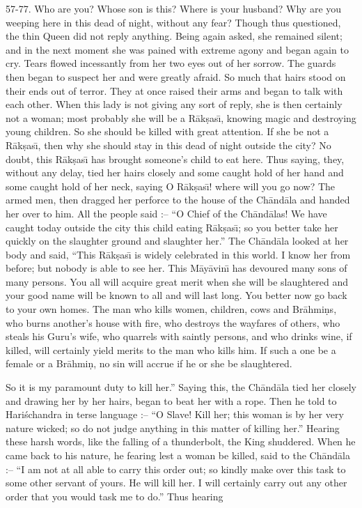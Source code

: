 57-77. Who are you? Whose son is this? Where is your husband? Why are you weeping here in this dead of night, without any fear? Though thus questioned, the thin Queen did not reply anything. Being again asked, she remained silent; and in the next moment she was pained with extreme agony and began again to cry. Tears flowed incessantly from her two eyes out of her sorrow. The guards then began to suspect her and were greatly afraid. So much that hairs stood on their ends out of terror. They at once raised their arms and began to talk with each other. When this lady is not giving any sort of reply, she is then certainly not a woman; most probably she will be a R\=ak\d{s}as\={\i}, knowing magic and destroying young children. So she should be killed with great attention. If she be not a R\=ak\d{s}as\={\i}, then why she should stay in this dead of night outside the city? No doubt, this R\=ak\d{s}as\={\i} has brought someone's child to eat here. Thus saying, they, without any delay, tied her hairs closely and some caught hold of her hand and some caught hold of her neck, saying O R\=ak\d{s}as\={\i}! where will you go now? The armed men, then dragged her perforce to the house of the Ch\=and\=ala and handed her over to him. All the people said :-- ``O Chief of the Ch\=and\=alas! We have caught today outside the city this child eating R\=ak\d{s}as\={\i}; so you better take her quickly on the slaughter ground and slaughter her.'' The Ch\=and\=ala looked at her body and said, ``This R\=ak\d{s}as\={\i} is widely celebrated in this world. I know her from before; but nobody is able to see her. This M\=ay\=avin\={\i} has devoured many sons of many persons. You all will acquire great merit when she will be slaughtered and your good name will be known to all and will last long. You better now go back to your own homes. The man who kills women, children, cows and Br\=ahmi\d{n}s, who burns another's house with fire, who destroys the wayfares of others, who steals his Guru's wife, who quarrels with saintly persons, and who drinks wine, if killed, will certainly yield merits to the man who kills him. If such a one be a female or a Br\=ahmi\d{n}, no sin will accrue if he or she be slaughtered.

So it is my paramount duty to kill her.'' Saying this, the Ch\=and\=ala tied her closely and drawing her by her hairs, began to beat her with a rope. Then he told to Hari\'schandra in terse language :-- ``O Slave! Kill her; this woman is by her very nature wicked; so do not judge anything in this matter of killing her.'' Hearing these harsh words, like the falling of a thunderbolt, the King shuddered. When he came back to his nature, he fearing lest a woman be killed, said to the Ch\=and\=ala :-- ``I am not at all able to carry this order out; so kindly make over this task to some other servant of yours. He will kill her. I will certainly carry out any other order that you would task me to do.'' Thus hearing

